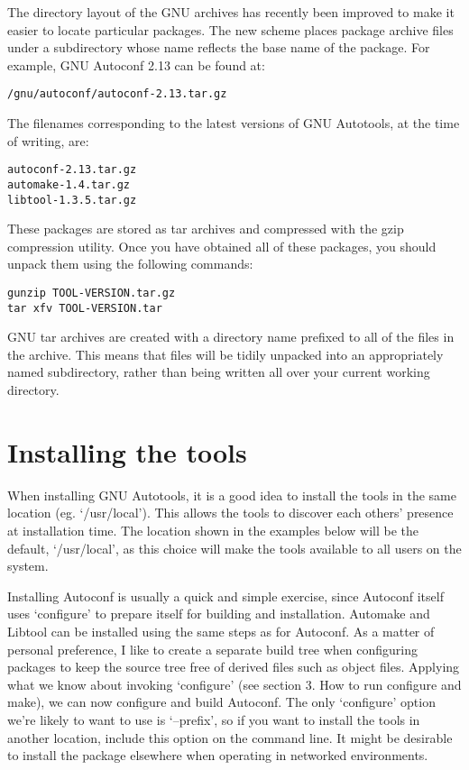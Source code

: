 The directory layout of the GNU archives has recently been improved to make it easier to locate particular packages. The new scheme places package archive files under a subdirectory whose name reflects the base name of the package. For example, GNU Autoconf 2.13 can be found at: 

\begin{Verbatim}[frame=single]
/gnu/autoconf/autoconf-2.13.tar.gz
\end{Verbatim}

The filenames corresponding to the latest versions of GNU Autotools, at the time of writing, are:

 	
\begin{Verbatim}[frame=single]
autoconf-2.13.tar.gz
automake-1.4.tar.gz
libtool-1.3.5.tar.gz
\end{Verbatim}

These packages are stored as tar archives and compressed with the gzip compression utility. Once you have obtained all of these packages, you should unpack them using the following commands:

\begin{Verbatim}[frame=single]
gunzip TOOL-VERSION.tar.gz
tar xfv TOOL-VERSION.tar
\end{Verbatim}

GNU tar archives are created with a directory name prefixed to all of the files in the archive. This means that files will be tidily unpacked into an appropriately named subdirectory, rather than being written all over your current working directory. 

\section{Installing the tools}

When installing GNU Autotools, it is a good idea to install the tools in the same location (eg. `/usr/local'). This allows the tools to discover each others' presence at installation time. The location shown in the examples below will be the default, `/usr/local', as this choice will make the tools available to all users on the system.

Installing Autoconf is usually a quick and simple exercise, since Autoconf itself uses `configure' to prepare itself for building and installation. Automake and Libtool can be installed using the same steps as for Autoconf. As a matter of personal preference, I like to create a separate build tree when configuring packages to keep the source tree free of derived files such as object files. Applying what we know about invoking `configure' (see section 3. How to run configure and make), we can now configure and build Autoconf. The only `configure' option we're likely to want to use is `--prefix', so if you want to install the tools in another location, include this option on the command line. It might be desirable to install the package elsewhere when operating in networked environments. 

